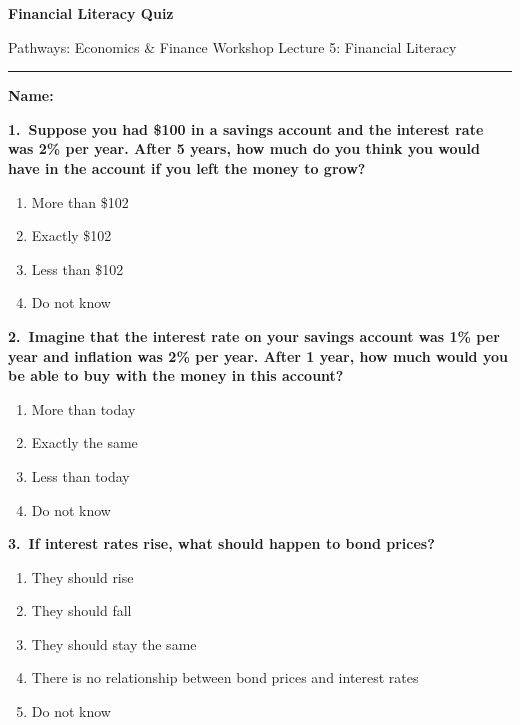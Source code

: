\documentclass[letterpaper,10pt]{article}
\begin{document}
\begin{center}
  {\Large\textbf{Financial Literacy Quiz}}

  \vspace{0.3em}
  {\small Pathways: Economics \& Finance Workshop \hfill Lecture 5: Financial Literacy}
\end{center}

\vspace{0.3em}
\hrule
\vspace{0.5em}

\textbf{Name:} \hrulefill

\vspace{0.8em}


\textbf{1.\ Suppose you had \$100 in a savings account and the interest rate was 2\% per year. After 5 years, how much do you think you would have in the account if you left the money to grow?}

\vspace{0.3em}
\begin{enumerate}[label=\alph*)]
  \item More than \$102
  \item Exactly \$102
  \item Less than \$102
  \item Do not know
\end{enumerate}

\vspace{1.5cm}

\textbf{2.\ Imagine that the interest rate on your savings account was 1\% per year and inflation was 2\% per year. After 1 year, how much would you be able to buy with the money in this account?}

\vspace{0.3em}
\begin{enumerate}[label=\alph*)]
  \item More than today
  \item Exactly the same
  \item Less than today
  \item Do not know
\end{enumerate}

\vspace{1.5cm}

\textbf{3.\ If interest rates rise, what should happen to bond prices?}

\vspace{0.3em}
\begin{enumerate}[label=\alph*)]
  \item They should rise
  \item They should fall
  \item They should stay the same
  \item There is no relationship between bond prices and interest rates
  \item Do not know
\end{enumerate}
\end{document}
